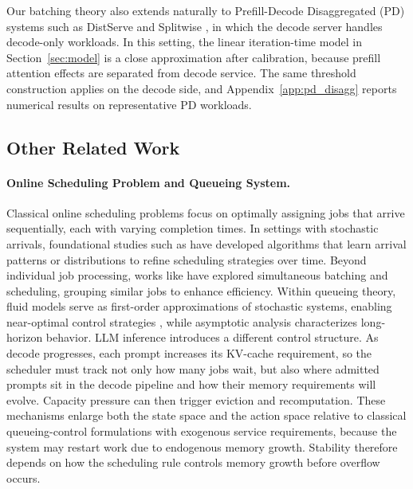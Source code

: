Our batching theory also extends naturally to Prefill-Decode Disaggregated (PD) systems such as DistServe \citep{zhong2024distserve} and Splitwise \citep{patel2024splitwise}, in which the decode server handles decode-only workloads. In this setting, the linear iteration-time model in Section~\ref{sec:model} is a close approximation after calibration, because prefill attention effects are separated from decode service. The same threshold construction applies on the decode side, and Appendix~\ref{app:pd_disagg} reports numerical results on representative PD workloads.

\subsection{Other Related Work}

\paragraph*{Online Scheduling Problem and Queueing System.} 
Classical online scheduling problems focus on optimally assigning jobs that arrive sequentially, each with varying completion times. In settings with stochastic arrivals, foundational studies such as \cite{devanur2009adwords,vee2010optimal,cole2014sample,balkanski2016power,lattanzi2020online} have developed algorithms that learn arrival patterns or distributions to refine scheduling strategies over time. Beyond individual job processing, works like \cite{im2013online,lucier2013efficient,liu2015online,li2020online} have explored simultaneous batching and scheduling, grouping similar jobs to enhance efficiency. Within queueing theory, fluid models serve as first-order approximations of stochastic systems, enabling near-optimal control strategies \cite{mandelbaum1998strong,maglaras2000discrete,bauerle2002optimal,liu2011network}, while asymptotic analysis characterizes long-horizon behavior. LLM inference introduces a different control structure. As decode progresses, each prompt increases its KV-cache requirement, so the scheduler must track not only how many jobs wait, but also where admitted prompts sit in the decode pipeline and how their memory requirements will evolve. Capacity pressure can then trigger eviction and recomputation. These mechanisms enlarge both the state space and the action space relative to classical queueing-control formulations with exogenous service requirements, because the system may restart work due to endogenous memory growth. Stability therefore depends on how the scheduling rule controls memory growth before overflow occurs.

